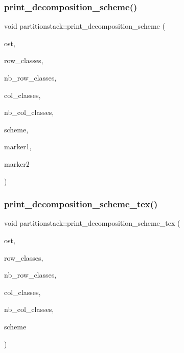 \subsubsection{\texorpdfstring{print\+\_\+decomposition\+\_\+scheme()}{print\_decomposition\_scheme()}}
{\footnotesize\ttfamily void partitionstack\+::print\+\_\+decomposition\+\_\+scheme (\begin{DoxyParamCaption}\item[{ostream \&}]{ost,  }\item[{\mbox{\hyperlink{galois_8h_a09fddde158a3a20bd2dcadb609de11dc}{I\+NT}} $\ast$}]{row\+\_\+classes,  }\item[{\mbox{\hyperlink{galois_8h_a09fddde158a3a20bd2dcadb609de11dc}{I\+NT}}}]{nb\+\_\+row\+\_\+classes,  }\item[{\mbox{\hyperlink{galois_8h_a09fddde158a3a20bd2dcadb609de11dc}{I\+NT}} $\ast$}]{col\+\_\+classes,  }\item[{\mbox{\hyperlink{galois_8h_a09fddde158a3a20bd2dcadb609de11dc}{I\+NT}}}]{nb\+\_\+col\+\_\+classes,  }\item[{\mbox{\hyperlink{galois_8h_a09fddde158a3a20bd2dcadb609de11dc}{I\+NT}} $\ast$}]{scheme,  }\item[{\mbox{\hyperlink{galois_8h_a09fddde158a3a20bd2dcadb609de11dc}{I\+NT}}}]{marker1,  }\item[{\mbox{\hyperlink{galois_8h_a09fddde158a3a20bd2dcadb609de11dc}{I\+NT}}}]{marker2 }\end{DoxyParamCaption})}

\mbox{\label{classpartitionstack_a4fcb124af962ca668742c4165ab77a90}} 
\subsubsection{\texorpdfstring{print\+\_\+decomposition\+\_\+scheme\+\_\+tex()}{print\_decomposition\_scheme\_tex()}}
{\footnotesize\ttfamily void partitionstack\+::print\+\_\+decomposition\+\_\+scheme\+\_\+tex (\begin{DoxyParamCaption}\item[{ostream \&}]{ost,  }\item[{\mbox{\hyperlink{galois_8h_a09fddde158a3a20bd2dcadb609de11dc}{I\+NT}} $\ast$}]{row\+\_\+classes,  }\item[{\mbox{\hyperlink{galois_8h_a09fddde158a3a20bd2dcadb609de11dc}{I\+NT}}}]{nb\+\_\+row\+\_\+classes,  }\item[{\mbox{\hyperlink{galois_8h_a09fddde158a3a20bd2dcadb609de11dc}{I\+NT}} $\ast$}]{col\+\_\+classes,  }\item[{\mbox{\hyperlink{galois_8h_a09fddde158a3a20bd2dcadb609de11dc}{I\+NT}}}]{nb\+\_\+col\+\_\+classes,  }\item[{\mbox{\hyperlink{galois_8h_a09fddde158a3a20bd2dcadb609de11dc}{I\+NT}} $\ast$}]{scheme }\end{DoxyParamCaption})}

